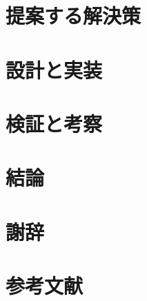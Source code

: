 \documentclass[a4paper]{jreport}
\begin{document}
\chapter{提案する解決策}


\chapter{設計と実装}


\chapter{検証と考察}


\chapter{結論}


\chapter{謝辞}
\chapter{参考文献}
\end{document}
